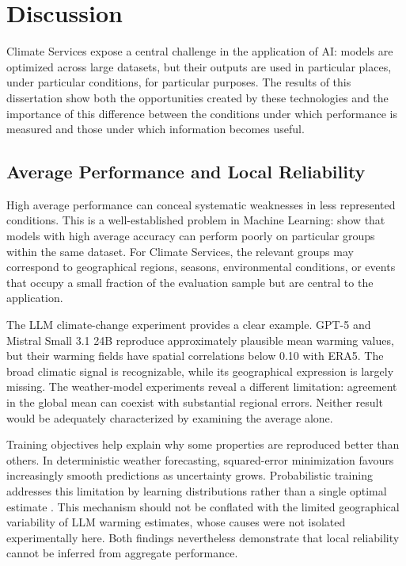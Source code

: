 \chapter{Discussion}

Climate Services expose a central challenge in the application of AI: models are optimized across large datasets, but their outputs are used in particular places, under particular conditions, for particular purposes. The results of this dissertation show both the opportunities created by these technologies and the importance of this difference between the conditions under which performance is measured and those under which information becomes useful.

\section{Average Performance and Local Reliability}

High average performance can conceal systematic weaknesses in less represented conditions. This is a well-established problem in Machine Learning: \citet{sagawa_distributionally_2020} show that models with high average accuracy can perform poorly on particular groups within the same dataset. For Climate Services, the relevant groups may correspond to geographical regions, seasons, environmental conditions, or events that occupy a small fraction of the evaluation sample but are central to the application.

The LLM climate-change experiment provides a clear example. GPT-5 and Mistral Small 3.1 24B reproduce approximately plausible mean warming values, but their warming fields have spatial correlations below 0.10 with ERA5. The broad climatic signal is recognizable, while its geographical expression is largely missing. The weather-model experiments reveal a different limitation: agreement in the global mean can coexist with substantial regional errors. Neither result would be adequately characterized by examining the average alone.

Training objectives help explain why some properties are reproduced better than others. In deterministic weather forecasting, squared-error minimization favours increasingly smooth predictions as uncertainty grows. Probabilistic training addresses this limitation by learning distributions rather than a single optimal estimate \citep{lang_aifs-crps_2026}. This mechanism should not be conflated with the limited geographical variability of LLM warming estimates, whose causes were not isolated experimentally here. Both findings nevertheless demonstrate that local reliability cannot be inferred from aggregate performance.

